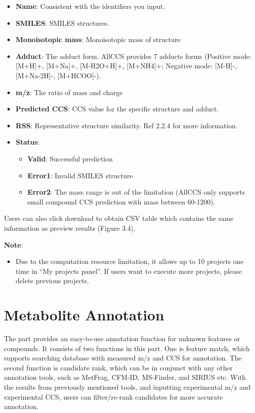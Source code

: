 \documentclass[12pt,]{book}
\providecommand{\tightlist}{%
  \setlength{\itemsep}{0pt}\setlength{\parskip}{0pt}}
\theoremstyle{definition}
\theoremstyle{definition}
\theoremstyle{definition}
\theoremstyle{remark}
\begin{document}
\begin{itemize}
\tightlist
\item
  \textbf{Name}: Consistent with the identifiers you input.
\item
  \textbf{SMILES}: SMILES structures.
\item
  \textbf{Monoisotopic mass}: Monoisotopic mass of structure
\item
  \textbf{Adduct}: The adduct form. AllCCS provides 7 adducts forms
  (Positive mode: {[}M+H{]}+, {[}M+Na{]}+, {[}M-H2O+H{]}+, {[}M+NH4{]}+;
  Negative mode: {[}M-H{]}-, {[}M+Na-2H{]}-, {[}M+HCOO{]}-).
\item
  \textbf{m/z}: The ratio of mass and charge
\item
  \textbf{Predicted CCS}: CCS value for the specific structure and
  adduct.
\item
  \textbf{RSS}: Representative structure similarity. Ref 2.2.4 for more
  information.
\item
  \textbf{Status}:

  \begin{itemize}
  \tightlist
  \item
    \textbf{Valid}: Successful prediction
  \item
    \textbf{Error1}: Invalid SMILES structure
  \item
    \textbf{Error2}: The mass range is out of the limitation (AllCCS
    only supports small compound CCS prediction with mass between
    60-1200).
  \end{itemize}
\end{itemize}

Users can also click download to obtain CSV table which contains the
same information as preview results (Figure 3.4).

\textbf{Note}:

\begin{itemize}
\tightlist
\item
  Due to the computation resource limitation, it allows up to 10
  projects one time in ``My projects panel''. If users want to execute
  more projects, please delete previous projects.
\end{itemize}

\chapter{Metabolite Annotation}\label{metannotation}

The part provides an easy-to-use annotation function for unknown
features or compounds. It consists of two functions in this part. One is
feature match, which supports searching database with measured m/z and
CCS for annotation. The second function is candidate rank, which can be
in conjunct with any other annotation tools, such as MetFrag, CFM-ID,
MS-Finder, and SIRIUS etc. With the results from previously mentioned
tools, and inputting experimental m/z and experimental CCS, users can
filter/re-rank candidates for more accurate annotation.
\end{document}
